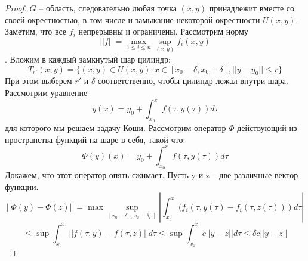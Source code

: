 \documentclass[document.tex]{subfiles}
\begin{document}
\begin{proof}
	$G$ -- область, следовательно любая точка $(x, y)$ принадлежит вместе со своей окрестностью, в том числе и замыкание некоторой окрестности
	$U(x, y)$. Заметим, что все $f_i$ непрерывны и ограничены.
	Рассмотрим норму $$||f|| = \max_{1 \leq i \leq n} \sup_{(x, y)} f_i(x, y)$$. Вложим в каждый замкнутый шар цилиндр: 
	$$T_{r'}(x, y) = \{(x, y) \in U(x, y) : x \in [x_0 - \delta, x_0 + \delta], ||y - y_0|| \leq r\}$$
	При этом выберем $r'$ и $\delta$ соответственно, чтобы цилиндр лежал внутри шара.
	Рассмотрим уравнение $$y(x) = y_0 + \int_{x_0}^x f(\tau, y(\tau))d\tau$$ для которого мы решаем задачу Коши. Рассмотрим оператор $\Phi$
	действующий из пространства функций на шаре в себя, такой что:
	$$\Phi (y) (x) = y_0 + \int_{x_0}^x f(\tau, y(\tau)) d\tau$$
	Докажем, что этот оператор опять сжимает. Пусть y и z -- две различные вектор функции.
	$$||\Phi(y) - \Phi(z)|| = \max \sup_{[x_0 - \delta_{r'}, x_0 + \delta_{r'}]} | \int_{x_0}^x (f_i(\tau, y(\tau) - f_i(\tau, z(\tau)))d\tau|$$
	$$\leq \sup \int_{x_0}^x ||f(\tau, y) - f(\tau, z)||d\tau \leq \sup \int_{x_0}^x c ||y-z||d\tau \leq \delta c||y-z||$$
\end{proof}
\end{document}
